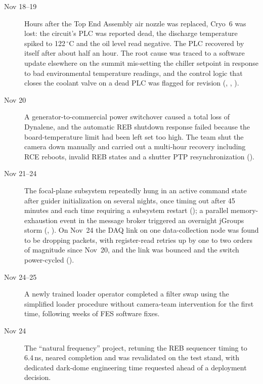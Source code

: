 \begin{description}
\item[Nov 18--19] Hours after the Top End Assembly air nozzle was
  replaced, Cryo~6 was lost: the circuit's PLC was reported dead, the
  discharge temperature spiked to 122\,$^{\circ}$C and the oil level
  read negative.  The PLC recovered by itself after about half an hour.
  The root cause was traced to a software update elsewhere on the
  summit mis-setting the chiller setpoint in response to bad
  environmental temperature readings, and the control logic that closes
  the coolant valve on a dead PLC was flagged for revision
  (, , ).

\item[Nov 20] A generator-to-commercial power switchover caused a
  total loss of Dynalene, and the automatic REB shutdown response
  failed because the board-temperature limit had been left set too
  high.  The team shut the camera down manually and carried out a
  multi-hour recovery including RCE reboots, invalid REB states and a
  shutter PTP resynchronization ().

\item[Nov 21--24] The focal-plane subsystem repeatedly hung in an
  active command state after guider initialization on several nights,
  once timing out after 45\,minutes and each time requiring a subsystem
  restart (); a parallel memory-exhaustion event in the
  message broker triggered an overnight jGroups storm (,
  ).  On Nov~24 the DAQ link on one data-collection node was
  found to be dropping packets, with register-read retries up by one to
  two orders of magnitude since Nov~20, and the link was bounced and
  the switch power-cycled ().

\item[Nov 24--25] A newly trained loader operator completed a filter
  swap using the simplified loader procedure without camera-team
  intervention for the first time, following weeks of FES software
  fixes.

\item[Nov 24] The ``natural frequency'' project, retuning the REB
  sequencer timing to 6.4\,ns, neared completion and was revalidated on
  the test stand, with dedicated dark-dome engineering time requested
  ahead of a deployment decision.
\end{description}

